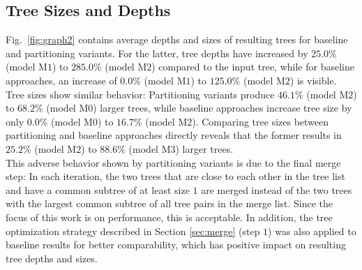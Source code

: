 \subsection{Tree Sizes and Depths}  
Fig.~\ref{fig:graph2} contains average depths and sizes of resulting trees for baseline and partitioning variants.
For the latter, tree depths have increased by $25.0\%$ (model M$1$) to $285.0\%$ (model M$2$) compared to the input tree, while for baseline approaches, an increase of $0.0\%$ (model M$1$) to $125.0\%$ (model M$2$) is visible.
Tree sizes show similar behavior:
Partitioning variants produce $46.1\%$ (model M$2$) to $68.2\%$ (model M$0$) larger trees, while baseline approaches increase tree size by only $0.0\%$ (model M$0$) to $16.7\%$ (model M$2$).
Comparing tree sizes between partitioning and baseline approaches directly reveals that the former results in $25.2\%$ (model M$2$) to $88.6\%$ (model M$3$) larger trees.
\\
This adverse behavior shown by partitioning variants is due to the final merge step:
In each iteration, the two trees that are close to each other in the tree list and have a common subtree of at least size $1$ are merged instead of the two trees with the largest common subtree of all tree pairs in the merge list. 
Since the focus of this work is on performance, this is acceptable.
In addition, the tree optimization strategy described in Section \ref{sec:merge} (step $1$) was also applied to baseline results for better comparability, which has positive impact on resulting tree depths and sizes.
